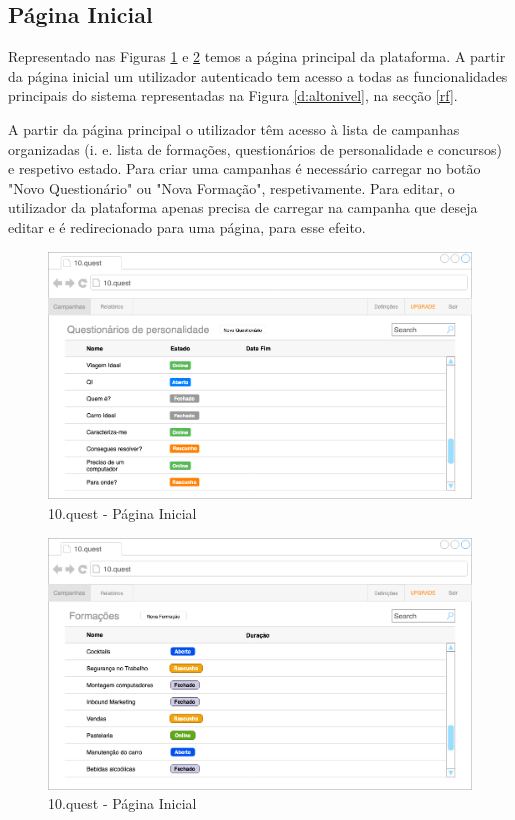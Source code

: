 \subsection{Página Inicial}

 Representado nas Figuras \ref{10q-home} e \ref{10q-home1} temos a página principal da plataforma. A partir da página inicial um utilizador autenticado tem acesso a todas as funcionalidades principais do sistema representadas na Figura \ref{d:altonivel}, na secção \ref{rf}.

A partir da página principal o utilizador têm acesso à lista de campanhas organizadas (i. e. lista de formações, questionários de personalidade e concursos) e respetivo estado. Para criar uma campanhas é necessário carregar no botão "Novo Questionário" ou "Nova Formação", respetivamente. Para editar, o utilizador da plataforma apenas precisa de carregar na campanha que deseja editar e é redirecionado para uma página, para esse efeito.

\begin{figure}[ht!]
	\begin{center}
		\includegraphics[width=1\textwidth]{img/prototipos/home-q.png}
		\caption{10.quest - Página Inicial}
		\label{10q-home}
	\end{center}
\end{figure}

\begin{figure}[ht!]
	\begin{center}
		\includegraphics[width=1\textwidth]{img/prototipos/home-f.png}
		\caption{10.quest - Página Inicial}
		\label{10q-home1}
	\end{center}
\end{figure}



